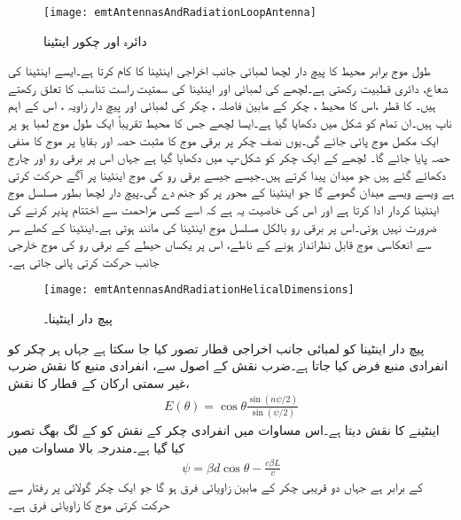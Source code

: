 \begin{figure}
\centering
\texttt{[image: emtAntennasAndRadiationLoopAntenna]}
\caption{دائرہ اور چکور اینٹینا}
\label{شکل_اینٹینا_دائرہ_چکور}
\end{figure}

طول موج برابر محیط کا پیچ دار لچھا لمبائی جانب اخراجی اینٹینا کا کام کرتا ہے۔ایسے اینٹینا کی شعاع،  دائری قطبیت رکھتی ہے۔لچھے کی لمبائی اور  اینٹینا کی سمتیت راست تناسب کا تعلق رکھتے ہیں۔ کا قطر ،اس کا محیط ، چکر کے مابین فاصلہ ، چکر کی لمبائی  اور پیچ دار زاویہ ، اس کے اہم ناپ ہیں۔ان تمام کو شکل  میں دکھایا گیا ہے۔ایسا لچھے جس  کا محیط  تقریباً  ایک طول موج  لمبا ہو پر ایک مکمل موج پائی جائے گی۔یوں نصف چکر پر برقی موج کا مثبت حصہ اور بقایا پر موج کا منفی حصہ پایا جائے گا۔ لچھے کے ایک چکر کو شکل-پ میں دکھایا گیا ہے جہاں اس پر برقی رو اور چارج دکھائے گئے ہیں جو میدان  پیدا کرتے ہیں۔جیسے جیسے برقی رو کی موج اینٹینا پر آگے حرکت کرتی ہے ویسے ویسے میدان  گھومے گا جو اینٹینا کے محور پر  کو جنم دے گی۔پیچ دار لچھا بطور مسلسل موج اینٹینا کردار ادا کرتا ہے اور اس کی خاصیت یہ ہے کہ اسے کسی مزاحمت سے اختتام پذیر کرنے کی ضرورت نہیں ہوتی۔اس پر برقی رو بالکل مسلسل موج اینٹینا کی مانند ہوتی ہے۔اینٹینا کے کھلے سر سے انعکاسی موج قابل نظرانداز ہونے کے ناطے، اس پر یکساں حیطے کے برقی رو کی موج خارجی جانب حرکت کرتی پائی جاتی ہے۔

\begin{figure}
\centering
\texttt{[image: emtAntennasAndRadiationHelicalDimensions]}
\caption{پیچ دار اینٹینا۔}
\label{شکل_اینٹینا_پیچ_دار_الف}
\end{figure}

پیچ دار اینٹینا کو لمبائی جانب اخراجی قطار تصور کیا جا سکتا ہے جہاں ہر چکر کو انفرادی منبع فرض کیا جاتا ہے۔ضرب نقش کے اصول سے، انفرادی منبع کا نقش ضرب غیر سمتی ارکان کے  قطار کا نقش، 
\begin{align}\label{مساوات_اینٹینا_لمبی_پیچ_دار_اینٹینا}
E(\theta)=\cos \theta \frac{\sin (n\psi\!/\!2)}{\sin(\psi\!/\!2)}
\end{align}
اینٹینے  کا نقش دیتا ہے۔اس مساوات میں انفرادی چکر کے نقش کو  کے لگ بھگ تصور کیا گیا ہے۔مندرجہ بالا مساوات میں
\begin{align}\label{مساوات_اینٹینا_لمبی_پیچ_دار_اینٹینا_زاویائی_فرق}
\psi=\beta d \cos \theta- \frac{c \beta L}{v}
\end{align}
کے برابر ہے جہاں دو قریبی چکر کے مابین زاویائی فرق  ہو گا جو  ایک چکر گولائی  پر  رفتار سے حرکت کرتی موج کا زاویائی فرق ہے۔

